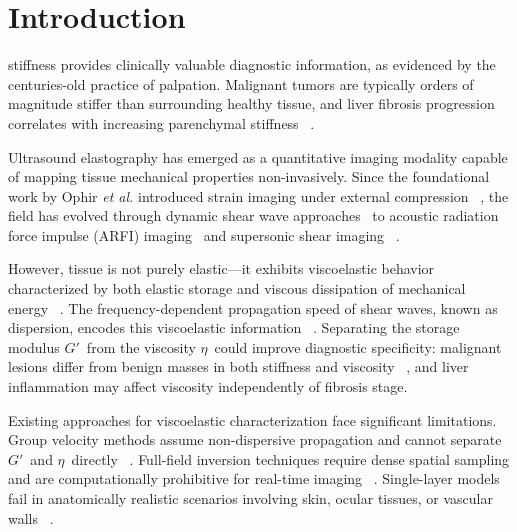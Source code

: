 \documentclass[journal,twoside,a4paper]{IEEEtran}
\newcommand{\Gprime}{$G'$}
\newcommand{\etav}{\ensuremath{\eta}}
\begin{document}
\IEEEpeerreviewmaketitle

\section{Introduction}
 stiffness provides clinically valuable diagnostic 
information, as evidenced by the centuries-old practice of palpation. 
Malignant tumors are typically orders of magnitude stiffer than surrounding 
healthy tissue, and liver fibrosis progression correlates with increasing 
parenchymal stiffness~
\cite{ophir1991elastography, sarvazyan1998shear, shiina2021review}.

Ultrasound elastography has emerged as a quantitative imaging modality 
capable of mapping tissue mechanical properties non-invasively. 
Since the foundational work by Ophir \textit{et al.} introduced strain 
imaging under external compression~
\cite{ophir1991elastography}, the field 
has evolved through dynamic shear wave approaches~
\cite{sarvazyan1998shear} 
to acoustic radiation force impulse (ARFI) imaging~
\cite{nightingale2002arfI} 
and supersonic shear imaging~
\cite{bercoff2004supersonic}.

However, tissue is not purely elastic---it exhibits viscoelastic behavior 
characterized by both elastic storage and viscous dissipation of mechanical 
energy~
\cite{chen2009shearwave, klatt2007noninvasive}. The frequency-dependent 
propagation speed of shear waves, known as dispersion, encodes this 
viscoelastic information~
\cite{deffieux2009shear, chen2010liver}. Separating 
the storage modulus \Gprime\ from the viscosity \etav\ could improve 
diagnostic specificity: malignant lesions differ from benign masses in 
both stiffness and viscosity~
\cite{zhang2022us}, and liver inflammation 
may affect viscosity independently of fibrosis stage.

Existing approaches for viscoelastic characterization face significant 
limitations. Group velocity methods assume non-dispersive propagation and 
cannot separate \Gprime\ and \etav\ directly~
\cite{shiina2021review}. 
Full-field inversion techniques require dense spatial sampling and are 
computationally prohibitive for real-time imaging~
\cite{zhang2021layer}. 
Single-layer models fail in anatomically realistic scenarios involving 
skin, ocular tissues, or vascular walls~
\cite{zhang2021layer}.
\end{document}
